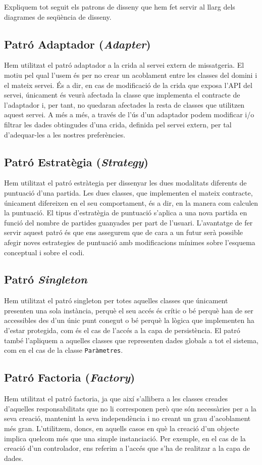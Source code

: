 Expliquem tot seguit els patrons de disseny que hem fet servir al llarg dels diagrames de seqüència de disseny.

\subsection{Patró Adaptador (\emph{Adapter})}
Hem utilitzat el patró adaptador a la crida al servei extern de missatgeria. El motiu pel qual l’usem és per no crear un acoblament entre les classes del domini i el mateix servei. És a dir, en cas de modificació de la crida que exposa l'API del servei, únicament és veurà afectada la classe que implementa el contracte de l'adaptador i, per tant, no quedaran afectades la resta de classes que utilitzen aquest servei.
A més a més, a través de l’ús d’un adaptador podem modificar i/o filtrar les dades obtingudes d’una crida, definida pel servei extern, per tal d’adequar-les a les nostres preferències.

\subsection{Patró Estratègia (\emph{Strategy})}
Hem utilitzat el patró estràtegia per dissenyar les dues modalitats diferents de puntuació d'una partida. Les dues classes, que implementen el mateix contracte, únicament difereixen en el seu comportament, és a dir, en la manera com calculen la puntuació. El tipus d’estratègia de puntuació s’aplica a una nova partida en funció del nombre de partides guanyades per part de l'usuari. L'avantatge de fer servir aquest patró és que ens assegurem que de cara a un futur serà possible afegir noves estrategies de puntuació amb modificacions mínimes sobre l’esquema conceptual i sobre el codi.

\subsection{Patró \emph{Singleton}}
Hem utilitzat el patró singleton per totes aquelles classes que únicament presenten una sola instància, perquè el seu accés és crític o bé perquè han de ser accessibles des d'un únic punt conegut o bé perquè la lògica que implementen ha d'estar protegida, com és el cas de l'accés a la capa de persistència. El patró també l'apliquem a aquelles classes que representen dades globals a tot el sistema, com en el cas de la classe \texttt{Paràmetres}.

\subsection{Patró Factoria (\emph{Factory})}
Hem utilitzat el patró factoria, ja que així s’allibera a les classes creades d’aquelles responsabilitats que no li corresponen però que són necessàries per a la seva creació, mantenint la seva independència i no creant un grau d'acoblament més gran. L’utilitzem, doncs, en aquells casos en què la creació d’un objecte implica quelcom més que una simple instanciació. Per exemple, en el cas de la creació d’un controlador, ens referim a l’accés que s’ha de realitzar a la capa de dades.


